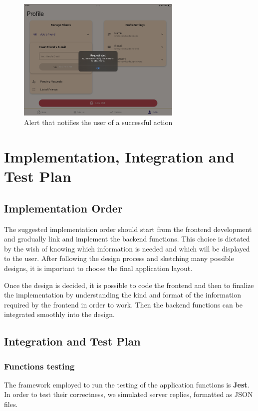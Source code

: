 \documentclass[12pt]{article}
\begin{document}
\begin{figure}[h!]
    \begin{center}
        \includegraphics[width=0.7\textwidth, clip]{../../assets/tablet/alert.PNG}
    \end{center}
    \caption{Alert that notifies the user of a successful action}
    \label{fig:talert}
\end{figure}

\clearpage
\section{Implementation, Integration and Test Plan}\label{sec:test}
\subsection{Implementation Order}
The suggested implementation order should start from the frontend development and gradually link and implement the backend functions. This choice is dictated by the wish of knowing which information is needed and which will be displayed to the user. After following the design process and sketching many possible designs, it is important to choose the final application layout.

Once the design is decided, it is possible to code the frontend and then to finalize the implementation by understanding the kind and format of the information required by the frontend in order to work. Then the backend functions can be integrated smoothly into the design.

\subsection{Integration and Test Plan}
\subsubsection{Functions testing}
The framework employed to run the testing of the application functions is \textbf{Jest}. In order to test their correctness, we simulated server replies, formatted as JSON files.
\end{document}

